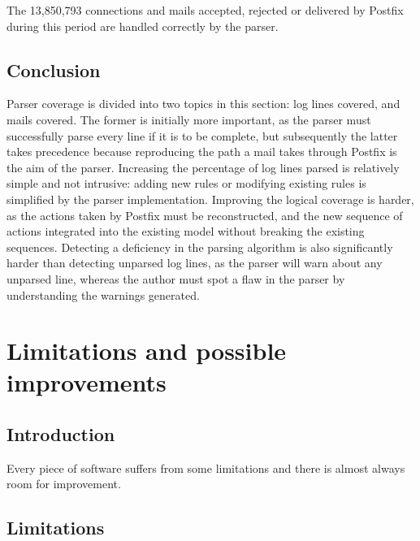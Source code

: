 \documentclass[a4paper,12pt,draft]{article}
\begin{document}
The 13,850,793 connections and mails accepted, rejected or delivered by
Postfix during this period are handled correctly by the parser.

\subsection{Conclusion}

Parser coverage is divided into two topics in this section: log lines
covered, and mails covered.  The former is initially more important, as the
parser must successfully parse every line if it is to be complete, but
subsequently the latter takes precedence because reproducing the path a
mail takes through Postfix is the aim of the parser.  Increasing the
percentage of log lines parsed is relatively simple and not intrusive:
adding new rules or modifying existing rules is simplified by the parser
implementation.  Improving the logical coverage is harder, as the actions
taken by Postfix must be reconstructed, and the new sequence of actions
integrated into the existing model without breaking the existing sequences.
Detecting a deficiency in the parsing algorithm is also significantly
harder than detecting unparsed log lines, as the parser will warn about any
unparsed line, whereas the author must spot a flaw in the parser by
understanding the warnings generated.

\section{Limitations and possible improvements}

\label{limitations-improvements}

\subsection{Introduction}

Every piece of software suffers from some limitations and there is almost
always room for improvement.

\subsection{Limitations}
\end{document}
